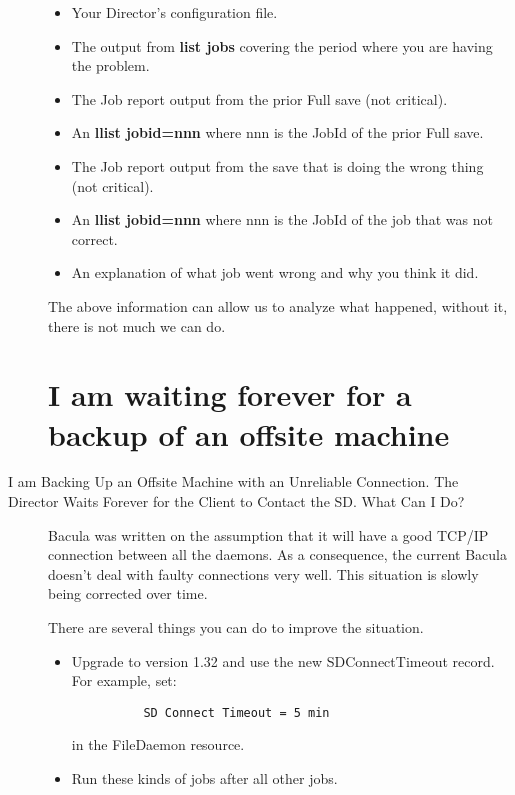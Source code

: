 \begin{description}
\begin{itemize}
\item Your Director's configuration file.
\item The output from {\bf list jobs} covering the period where you  are
   having the problem.
\item The Job report output from the prior Full save (not critical).
\item An {\bf llist jobid=nnn} where nnn is the JobId of the prior  Full save.

\item The Job report output from the save that is doing the  wrong thing (not
   critical).
\item An {\bf llist jobid=nnn} where nnn is the JobId of the job  that was not
   correct.
\item An explanation of what job went wrong and why you think it did.
   \end{itemize}

The above information can allow us to analyze what happened, without it,
there is not much we can do.

\label{WaitForever}
\section{I am waiting forever for a backup of an offsite machine}
\item [I am Backing Up an Offsite Machine with an Unreliable Connection.
   The  Director Waits Forever for the Client to Contact the SD. What Can  I
   Do?]
   Bacula was written on the assumption that it will have a good TCP/IP
   connection between all the daemons.  As a consequence, the current
   Bacula doesn't deal with faulty connections very well.  This situation
   is slowly being corrected over time.

   There are several things you can do to improve the situation.

\begin{itemize}
\item Upgrade to version 1.32 and use the new SDConnectTimeout record.  For
   example, set:

\footnotesize
\begin{verbatim}
          SD Connect Timeout = 5 min

\end{verbatim}
\normalsize

in the FileDaemon resource.
\item Run these kinds of jobs after all other jobs.
   \end{itemize}


\end{description}
